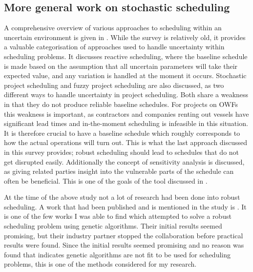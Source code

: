 \documentclass[a4paper,12pt]{article}
\begin{document}
\subsection{More general work on stochastic scheduling} \label{ss:stoch}
A comprehensive overview of various approaches to scheduling within an uncertain environment is given in \cite{herroelen2005project}. While the survey is relatively old, it provides a valuable categorisation of approaches used to handle uncertainty within scheduling problems. It discusses reactive scheduling, where the baseline schedule is made based on the assumption that all uncertain parameters will take their expected value, and any variation is handled at the moment it occurs. Stochastic project scheduling and fuzzy project scheduling are also discussed, as two different ways to handle uncertainty in project scheduling. Both share a weakness in that they do not produce reliable baseline schedules. For projects on OWFs this weakness is important, as contractors and companies renting out vessels have significant lead times and in-the-moment scheduling is infeasible in this situation. It is therefore crucial to have a baseline schedule which roughly corresponds to how the actual operations will turn out. This is what the last approach discussed in this survey provides; robust scheduling should lead to schedules that do not get disrupted easily. Additionally the concept of sensitivity analysis is discussed, as giving related parties insight into the vulnerable parts of the schedule can often be beneficial. This is one of the goals of the tool discussed in . 

At the time of the above study not a lot of research had been done into robust scheduling. A work that had been published and is mentioned in the study is \cite{sevaux2002genetic}. It is one of the few works I was able to find which attempted to solve a robust scheduling problem using genetic algorithms. Their initial results seemed promising, but their industry partner stopped the collaboration before practical results were found. Since the initial results seemed promising and no reason was found that indicates genetic algorithms are not fit to be used for scheduling problems, this is one of the methods considered for my research.

\bigskip
\end{document}
